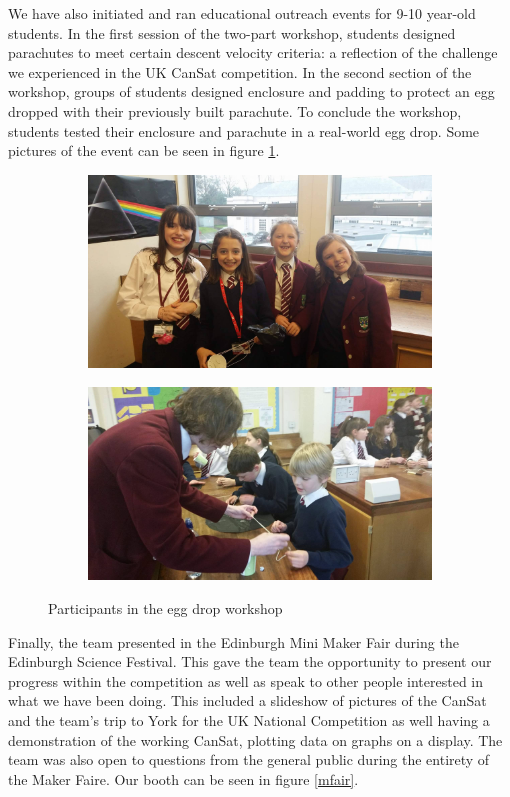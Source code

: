 \documentclass[]{report}
\begin{document}
We have also initiated and ran educational outreach events for 9-10 year-old students. In the first session of the two-part workshop, students designed parachutes to meet certain descent velocity criteria: a reflection of the challenge we experienced in the UK CanSat competition. In the second section of the workshop, groups of students designed enclosure and padding to protect an egg dropped with their previously built parachute. To conclude the workshop, students tested their enclosure and parachute in a real-world egg drop. Some pictures of the event can be seen in figure \ref{eggdrop}.

\begin{figure}
	\centering
	\begin{subfigure}{.5\textwidth}
		\centering
		\includegraphics[width=.8\linewidth]{ed1.jpg}
	\end{subfigure}%
	\begin{subfigure}{.5\textwidth}
		\centering
		\includegraphics[width=0.8\linewidth, angle=0]{ed2.jpg}
	\end{subfigure}
	\caption{Participants in the egg drop workshop}
	\label{eggdrop}
\end{figure}

Finally, the team presented in the Edinburgh Mini Maker Fair during the Edinburgh Science Festival. This gave the team the opportunity to present our progress within the competition as well as speak to other people interested in what we have been doing. This included a slideshow of pictures of the CanSat and the team's trip to York for the UK National Competition as well having a demonstration of the working CanSat, plotting data on graphs on a display. The team was also open to questions from the general public during the entirety of the Maker Faire. Our booth can be seen in figure \ref{mfair}.
\end{document}
